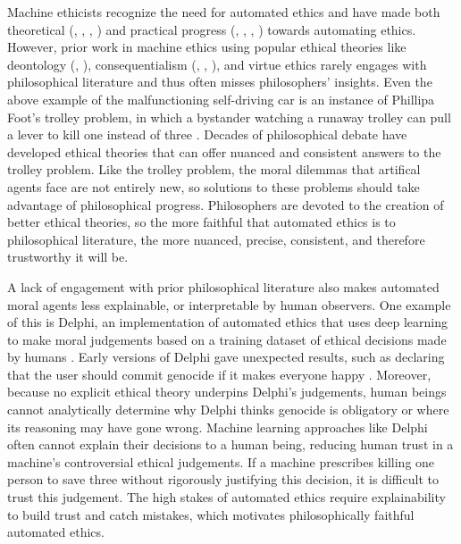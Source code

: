 \begin{isabellebody}
\begin{isamarkuptext}
Machine ethicists recognize the need for automated ethics and have made both theoretical 
(\citep{moralmachineonline}, \citep{davenport}, \citep{moralmachine}, \citep{gabriel}) and practical progress 
(\citep{logicprogramming}, \citep{biology}, \citep{delphi}, \citep{winfield}) towards automating ethics. 
However, prior work in machine ethics using popular ethical theories like deontology (\citep{deon2}, \citep{deon1}), 
consequentialism (\citep{util1}, \citep{util2}, \citep{cloos}), and virtue ethics \citep{virtue2} rarely 
engages with philosophical literature and thus often misses philosophers' insights. Even the above example of 
the malfunctioning self-driving car is an instance of Phillipa Foot's trolley problem, 
in which a bystander watching a runaway trolley can pull a lever to kill one instead of three \citep{foot}. 
Decades of philosophical debate have developed ethical theories that can offer nuanced and 
consistent answers to the trolley problem. Like the trolley problem, the moral dilemmas 
that artifical agents face are not entirely new, so solutions to these problems should take advantage of philosophical 
progress. Philosophers are devoted to the creation of better ethical theories, so the 
more faithful that automated ethics is to philosophical literature, the more nuanced, precise, consistent, and
therefore trustworthy it will be.

A lack of engagement with prior philosophical literature also makes automated moral agents less 
explainable, or interpretable by human observers. One example of this is Delphi, an implementation of automated ethics that uses deep 
learning to make moral judgements based on a training dataset of ethical decisions made by humans \citep{delphi}. 
Early versions of Delphi gave unexpected results, such as declaring that the user should commit 
genocide if it makes everyone happy \citep{verge}. Moreover, because no explicit ethical theory underpins 
Delphi's judgements, human beings cannot analytically determine why Delphi thinks genocide is obligatory
or where its reasoning may have gone wrong. 
Machine learning approaches like Delphi often cannot explain their decisions to a human being, reducing
human trust in a machine's controversial ethical judgements. If a machine prescribes killing one person 
to save three without rigorously justifying this decision, it is difficult to trust this judgement. 
The high stakes of automated ethics require explainability to build trust and catch mistakes, which
motivates philosophically faithful automated ethics.


\end{isamarkuptext}
\end{isabellebody}
